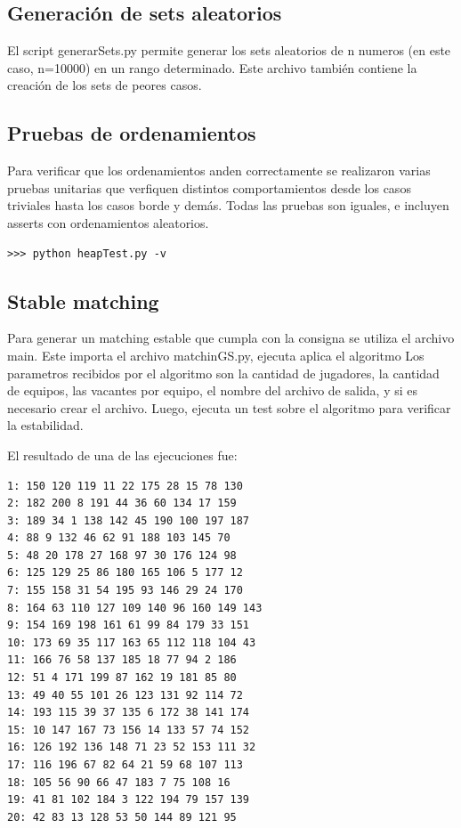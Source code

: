 \documentclass[article,a4paper]{article}
\begin{document}
\subsection{Generación de sets aleatorios}

El script generarSets.py permite generar los sets aleatorios de n numeros (en este caso, n=10000) en un rango determinado. Este archivo también contiene la creación de los sets de peores casos.

\subsection{Pruebas de ordenamientos}
Para verificar que los ordenamientos anden correctamente se realizaron varias pruebas unitarias que verfiquen distintos comportamientos desde los casos triviales hasta los casos borde y demás. Todas las pruebas son iguales, e incluyen asserts con ordenamientos aleatorios.

\begin{verbatim}
>>> python heapTest.py -v
\end{verbatim}

\subsection{Stable matching}
Para generar un matching estable que cumpla con la consigna se utiliza el archivo main. Este importa el archivo matchinGS.py, ejecuta aplica el algoritmo Los parametros recibidos por el algoritmo son la cantidad de jugadores, la cantidad de equipos, las vacantes por equipo, el nombre del archivo de salida, y si es necesario crear el archivo. Luego, ejecuta un test sobre el algoritmo para verificar la estabilidad.

El resultado de una de las ejecuciones fue:

\begin{center}
\begin{BVerbatim}
1: 150 120 119 11 22 175 28 15 78 130
2: 182 200 8 191 44 36 60 134 17 159
3: 189 34 1 138 142 45 190 100 197 187
4: 88 9 132 46 62 91 188 103 145 70
5: 48 20 178 27 168 97 30 176 124 98
6: 125 129 25 86 180 165 106 5 177 12
7: 155 158 31 54 195 93 146 29 24 170
8: 164 63 110 127 109 140 96 160 149 143
9: 154 169 198 161 61 99 84 179 33 151
10: 173 69 35 117 163 65 112 118 104 43
11: 166 76 58 137 185 18 77 94 2 186
12: 51 4 171 199 87 162 19 181 85 80
13: 49 40 55 101 26 123 131 92 114 72
14: 193 115 39 37 135 6 172 38 141 174
15: 10 147 167 73 156 14 133 57 74 152
16: 126 192 136 148 71 23 52 153 111 32
17: 116 196 67 82 64 21 59 68 107 113
18: 105 56 90 66 47 183 7 75 108 16
19: 41 81 102 184 3 122 194 79 157 139
20: 42 83 13 128 53 50 144 89 121 95
\end{BVerbatim}
\end{center}
\end{document}
